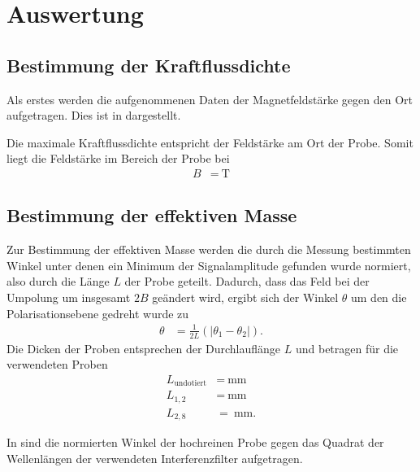 \section{Auswertung}
\label{sec:Auswertung}


\subsection{Bestimmung der Kraftflussdichte}
\label{sub:Kraftflussdichte}

Als erstes werden die aufgenommenen Daten der Magnetfeldstärke gegen den Ort aufgetragen.
Dies ist in
dargestellt.


Die maximale Kraftflussdichte entspricht der Feldstärke am Ort der Probe.
Somit liegt die Feldstärke im Bereich der Probe bei 
\begin{align*}
  B &= \qty{}{\tesla}
\end{align*}

\subsection{Bestimmung der effektiven Masse}
\label{sub:effektiveMasse}

Zur Bestimmung der effektiven Masse werden die durch die Messung bestimmten Winkel unter denen ein Minimum der Signalamplitude gefunden wurde
normiert, also durch die Länge $L$ der Probe geteilt.
Dadurch, dass das Feld bei der Umpolung um insgesamt $\num{2}B$ geändert wird, ergibt sich der Winkel $\theta$ um den die Polarisationsebene
gedreht wurde zu
\begin{align}
  \theta &= \frac{1}{2L}(\lvert \theta_1-\theta_2 \rvert).
\end{align}
Die Dicken der Proben entsprechen der Durchlauflänge $L$ und betragen für die verwendeten Proben
\begin{align*}
  L_{\text{undotiert}}&= \qty{}{\milli\meter}\\
  L_{1,2}&= \qty{}{\milli\meter}\\
  L_{2,8}&= \qty{}{\milli\meter}.
\end{align*}

In
sind die normierten Winkel der hochreinen Probe gegen das Quadrat der Wellenlängen der verwendeten Interferenzfilter aufgetragen.

